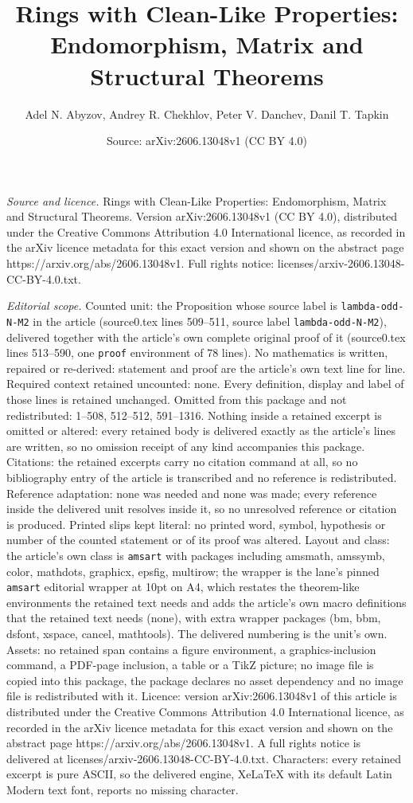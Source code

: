 \documentclass[10pt,a4paper]{amsart}
\title[Rings with Clean-Like Properties: Endomorphism, Matrix and S]{Rings with Clean-Like Properties: Endomorphism, Matrix and Structural Theorems}
\author{Adel N. Abyzov, Andrey R. Chekhlov, Peter V. Danchev, Danil T. Tapkin}
\date{Source: arXiv:2606.13048v1 (CC BY 4.0)}
\begin{document}
\maketitle

\noindent\emph{Source and licence.} Rings with Clean-Like Properties: Endomorphism, Matrix and Structural Theorems. Version arXiv:2606.13048v1 (CC BY 4.0), distributed under the Creative Commons Attribution 4.0 International licence, as recorded in the arXiv licence metadata for this exact version and shown on the abstract page https://arxiv.org/abs/2606.13048v1. Full rights notice: licenses/arxiv-2606.13048-CC-BY-4.0.txt.\par\smallskip

\noindent\textit{Editorial scope.} Counted unit: the Proposition whose source label is \texttt{lambda-odd-N-M2} in the article (source0.tex lines 509--511, source label \texttt{lambda-odd-N-M2}), delivered together with the article's own complete original proof of it (source0.tex lines 513--590, one \texttt{proof} environment of 78 lines). No mathematics is written, repaired or re-derived: statement and proof are the article's own text line for line. Required context retained uncounted: none. Every definition, display and label of those lines is retained unchanged. Omitted from this package and not redistributed: 1--508, 512--512, 591--1316. Nothing inside a retained excerpt is omitted or altered: every retained body is delivered exactly as the article's lines are written, so no omission receipt of any kind accompanies this package. Citations: the retained excerpts carry no citation command at all, so no bibliography entry of the article is transcribed and no reference is redistributed. Reference adaptation: none was needed and none was made; every reference inside the delivered unit resolves inside it, so no unresolved reference or citation is produced. Printed slips kept literal: no printed word, symbol, hypothesis or number of the counted statement or of its proof was altered. Layout and class: the article's own class is \texttt{amsart} with packages including amsmath, amssymb, color, mathdots, graphicx, epsfig, multirow; the wrapper is the lane's pinned \texttt{amsart} editorial wrapper at 10pt on A4, which restates the theorem-like environments the retained text needs and adds the article's own macro definitions that the retained text needs (none), with extra wrapper packages (bm, bbm, dsfont, xspace, cancel, mathtools). The delivered numbering is the unit's own. Assets: no retained span contains a figure environment, a graphics-inclusion command, a PDF-page inclusion, a table or a TikZ picture; no image file is copied into this package, the package declares no asset dependency and no image file is redistributed with it. Licence: version arXiv:2606.13048v1 of this article is distributed under the Creative Commons Attribution 4.0 International licence, as recorded in the arXiv licence metadata for this exact version and shown on the abstract page https://arxiv.org/abs/2606.13048v1. A full rights notice is delivered at licenses/arxiv-2606.13048-CC-BY-4.0.txt. Characters: every retained excerpt is pure ASCII, so the delivered engine, XeLaTeX with its default Latin Modern text font, reports no missing character.
\end{document}
